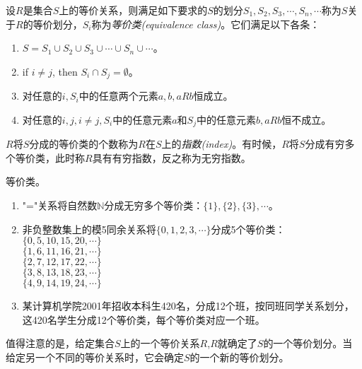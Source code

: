 \begin{definition}
	设$R$是集合$S$上的等价关系，则满足如下要求的$S$的划分$S_1,S_2,S_3,\cdots,S_n,\cdots$称为$S$关于$R$的等价划分，$S_i$称为\emph{等价类(equivalence class)}。它们满足以下各条：
	\begin{enumerate}
		\item $S=S_1\cup S_2\cup S_3\cup\cdots\cup S_n\cup\cdots$。
		\item if $i\ne j$, then $S_i\cap S_j=\emptyset$。
		\item 对任意的$i,S_i$中的任意两个元素$a,b,aRb$恒成立。
		\item 对任意的$i,j,i\ne j,S_i$中的任意元素$a$和$S_j$中的任意元素$b,aRb$恒不成立。
	\end{enumerate}

    $R$将$S$分成的等价类的个数称为$R$在$S$上的\emph{指数(index)}。有时候，$R$将$S$分成有穷多个等价类，此时称$R$具有有穷指数，反之称为无穷指数。
\end{definition}

\begin{example} 等价类。
	\begin{enumerate}
		\item "="关系将自然数$\mathbb{N}$分成无穷多个等价类：$\{1\},\{2\},\{3\},\cdots$。
		\item 非负整数集上的模5同余关系将$\{0,1,2,3,\cdots\}$分成5个等价类：\\
		$\{0,5,10,15,20,\cdots\}$\\
		$\{1,6,11,16,21,\cdots\}$\\
		$\{2,7,12,17,22,\cdots\}$\\
		$\{3,8,13,18,23,\cdots\}$\\
		$\{4,9,14,19,24,\cdots\}$
		\item 某计算机学院2001年招收本科生420名，分成12个班，按同班同学关系划分，这420名学生分成12个等价类，每个等价类对应一个班。
	\end{enumerate}
\end{example}

\begin{note}
值得注意的是，给定集合$S$上的一个等价关系$R$,$R$就确定了$S$的一个等价划分。当给定另一个不同的等价关系时，它会确定$S$的一个新的等价划分。
\end{note}

